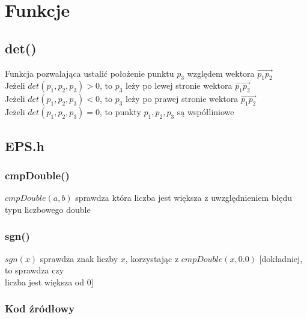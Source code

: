 \documentclass{article}
\begin{document}
\section{Funkcje}

\subsection{det()}
Funkcja pozwalająca ustalić położenie punktu $p_3$ względem wektora $\overrightarrow{p_1p_2}$ \\ Jeżeli $det(p_1, p_2, p_3) > 0$, to $p_3$ leży po lewej stronie wektora $\overrightarrow{p_1p_2}$\\ Jeżeli $det(p_1, p_2, p_3) < 0$, to $p_3$ leży po prawej stronie wektora $\overrightarrow{p_1p_2}$\\ Jeżeli $det(p_1, p_2, p_3) = 0$, to punkty $p_1, p_2, p_3$ są współliniowe




\subsection{EPS.h}
\subsubsection{cmpDouble()}
$cmpDouble(a, b)$ sprawdza która liczba jest większa z uwzględnieniem błędu typu liczbowego double
\subsubsection{sgn()}
$sgn(x)$ sprawdza znak liczby $x$, korzystając z $cmpDouble(x, 0.0)$ [dokładniej, to sprawdza czy \\ liczba jest większa od 0]
\subsubsection{Kod źródłowy}

\end{document}
